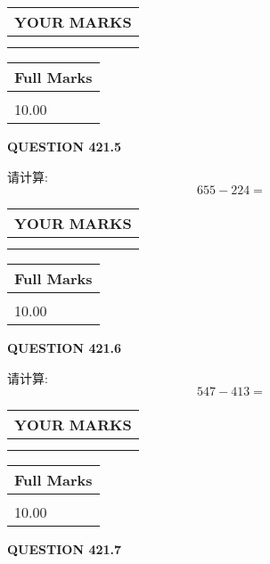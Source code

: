 \documentclass{ctexart}
\begin{document}
 

 
  
\vspace{0.2in}
  
\noindent\begin{tabular}{|l|}
\hline
 YOUR MARKS  \\
\hline
 \\ 
 \\ 
\hline
\end{tabular}
\hspace{0.05in} \begin{tabular}{|l|}
\hline
 Full Marks  \\
\hline
 \\ 
10.00 \\
\hline
\end{tabular}
{\textbf{\Large{QUESTION
421.5 
}}}
  
  
 
请计算:
\begin{equation}
655 -   %
224 = \nonumber
\end{equation}
 

 

 
  
\vspace{0.2in}
  
\noindent\begin{tabular}{|l|}
\hline
 YOUR MARKS  \\
\hline
 \\ 
 \\ 
\hline
\end{tabular}
\hspace{0.05in} \begin{tabular}{|l|}
\hline
 Full Marks  \\
\hline
 \\ 
10.00 \\
\hline
\end{tabular}
{\textbf{\Large{QUESTION
421.6 
}}}
  
  
 
请计算:
\begin{equation}
547 -   %
413 = \nonumber
\end{equation}
 

 

 
  
\vspace{0.2in}
  
\noindent\begin{tabular}{|l|}
\hline
 YOUR MARKS  \\
\hline
 \\ 
 \\ 
\hline
\end{tabular}
\hspace{0.05in} \begin{tabular}{|l|}
\hline
 Full Marks  \\
\hline
 \\ 
10.00 \\
\hline
\end{tabular}
{\textbf{\Large{QUESTION
421.7 
}}}
  
\end{document}
